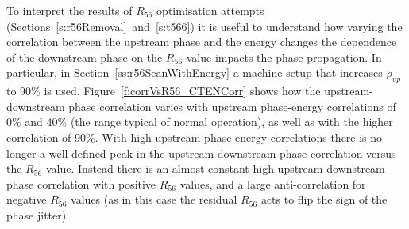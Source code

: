 To interpret the results of \(R_{56}\) optimisation attempts (Sections~\ref{s:r56Removal}~and~\ref{s:t566}) it is useful to understand how varying the correlation between the upstream phase and the energy changes the dependence of the downstream phase on the \(R_{56}\) value impacts the phase propagation. In particular, in Section~\ref{ss:r56ScanWithEnergy} a machine setup that increases \(\rho_{up}\) to 90\% is used. Figure~\ref{f:corrVsR56_CTENCorr} shows how the upstream-downstream phase correlation varies with upstream phase-energy correlations of 0\% and 40\% (the range typical of normal operation), as well as with the higher correlation of 90\%. With high upstream phase-energy correlations there is no longer a well defined peak in the upstream-downstream phase correlation versus the \(R_{56}\) value. Instead there is an almost constant high upstream-downstream phase correlation with positive \(R_{56}\) values, and a large anti-correlation for negative \(R_{56}\) values (as in this case the residual \(R_{56}\) acts to flip the sign of the phase jitter). 

